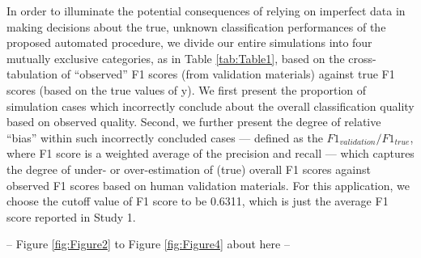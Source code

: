 \documentclass[man, 12pt, a4paper, nolmodern, noextraspace]{apa6}
\begin{document}
    In order to illuminate the potential consequences of relying on imperfect data in making decisions about the true, unknown classification performances of the proposed automated procedure, we divide our entire simulations into four mutually exclusive categories, as in Table \ref{tab:Table1}, based on the cross-tabulation of \enquote{observed} F1 scores (from validation materials) against true F1 scores (based on the true values of y). We first present the proportion of simulation cases which incorrectly conclude about the overall classification quality based on observed quality. Second, we further present the degree of relative \enquote{bias} within such incorrectly concluded cases --- defined as the $ F1_{validation}/F1_{true} $, where F1 score is a weighted average of the precision and recall --- which captures the degree of under- or over-estimation of (true) overall F1 scores against observed F1 scores based on human validation materials. For this application, we choose the cutoff value of F1 score to be 0.6311, which is just the average F1 score reported in Study 1.
\centerline{ -- Figure \ref{fig:Figure2} to Figure \ref{fig:Figure4} about here -- }    
\end{document}
